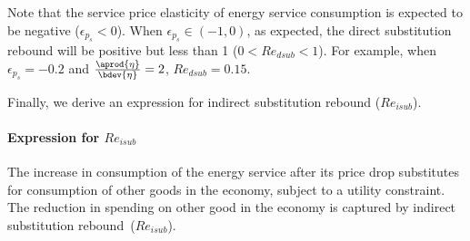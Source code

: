 Note that the service price elasticity of energy service consumption is
expected to be negative ($\epsilon_{p_s} < 0$).
When $\epsilon_{p_s} \in (-1, 0)$, as expected,
the direct substitution rebound will be positive but less than 1 ($0 < Re_{dsub} < 1$).
For example, when $\epsilon_{p_s} = -0.2$ and $\frac{\aprod{\eta}}{\bdev{\eta}} = 2$, 
$Re_{dsub} = 0.15$.

Finally, we derive an expression for indirect substitution rebound ($Re_{isub}$).


\paragraph{Expression for $Re_{isub}$} 
\label{sec:Re_isub}

The increase in consumption of the energy service after its price drop
substitutes for consumption of other goods in the economy, 
subject to a utility constraint. 
The reduction in spending on other good in the economy 
is captured by indirect substitution rebound~($Re_{isub}$).

